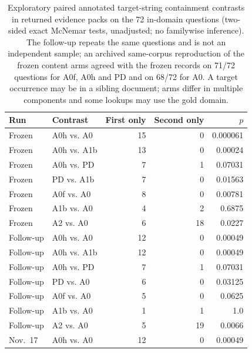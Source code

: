 \begin{table}[t]
\centering\small
\caption{Exploratory paired annotated target-string containment contrasts in
returned evidence packs on the 72 in-domain questions (two-sided exact
McNemar tests, unadjusted; no familywise inference). The follow-up repeats the
same questions and is not an independent sample; an archived same-corpus
reproduction of the frozen content arms agreed with the frozen records on
71/72 questions for A0f, A0h and PD and on 68/72 for A0. A target occurrence
may be in a sibling document; arms differ in multiple components and some
lookups may use the gold domain.}
\label{tab:s-paired-data}
\begin{tabular}{llrrr}
\toprule
Run & Contrast & First only & Second only & $p$ \\
\midrule
Frozen & A0h vs. A0 & 15 & 0 & 0.000061 \\
Frozen & A0h vs. A1b & 13 & 0 & 0.00024 \\
Frozen & A0h vs. PD & 7 & 1 & 0.07031 \\
Frozen & PD vs. A1b & 7 & 0 & 0.01563 \\
Frozen & A0f vs. A0 & 8 & 0 & 0.00781 \\
Frozen & A1b vs. A0 & 4 & 2 & 0.6875 \\
Frozen & A2 vs. A0 & 6 & 18 & 0.0227 \\
Follow-up & A0h vs. A0 & 12 & 0 & 0.00049 \\
Follow-up & A0h vs. A1b & 12 & 0 & 0.00049 \\
Follow-up & A0h vs. PD & 7 & 1 & 0.07031 \\
Follow-up & PD vs. A0 & 6 & 0 & 0.03125 \\
Follow-up & A0f vs. A0 & 5 & 0 & 0.0625 \\
Follow-up & A1b vs. A0 & 1 & 1 & 1.0 \\
Follow-up & A2 vs. A0 & 5 & 19 & 0.0066 \\
Nov.\ 17 & A0h vs. A0 & 12 & 0 & 0.00049 \\
\bottomrule
\end{tabular}
\end{table}
